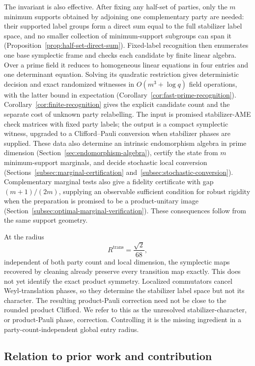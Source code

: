 The invariant is also effective.  After fixing any half-set of parties,
only the \(m\) minimum supports obtained by adjoining one complementary
party are needed: their supported label groups form a direct sum equal to
the full stabilizer label space, and no smaller collection of
minimum-support subgroups can span it
(Proposition~\ref{prop:half-set-direct-sum}).  Fixed-label recognition then
enumerates one base symplectic frame and checks each candidate by finite
linear algebra.  Over a prime field it reduces to homogeneous linear
equations in four entries and one determinant equation.  Solving its
quadratic restriction gives deterministic decision and exact randomized
witnesses in \(O(m^3+\log q)\) field operations, with the latter bound
in expectation (Corollary~\ref{cor:fast-prime-recognition}).  Corollary~\ref{cor:finite-recognition} gives the explicit
candidate count and the separate cost of unknown party relabelling.
The input is promised stabilizer-AME check matrices with fixed party labels;
the output is a compact symplectic witness, upgraded to a Clifford--Pauli
conversion when stabilizer phases are supplied.  These data also determine
an intrinsic endomorphism algebra in prime dimension
(Section~\ref{sec:endomorphism-algebra}), certify the state from \(m\)
minimum-support marginals, and decide stochastic local conversion
(Sections~\ref{subsec:marginal-certification} and~\ref{subsec:stochastic-conversion}).  Complementary marginal tests also give a fidelity certificate with gap
\((m+1)/(2m)\), supplying an observable sufficient condition for robust
rigidity when the preparation is promised to be a product-unitary image
(Section~\ref{subsec:optimal-marginal-verification}).  These consequences
follow from the same support geometry.

At the radius
\[
 R^{\mathrm{trans}}=\frac{\sqrt2}{68},                 \tag{1.4}
\]
independent of both party count and local dimension,
the symplectic maps recovered by cleaning already preserve every transition
map exactly.  This does not yet identify the exact product symmetry.
Localized commutators cancel Weyl-translation phases, so they determine the
stabilizer label space but not its character.  The resulting product-Pauli
correction need not be close to the rounded product Clifford.  We refer to
this as the unresolved stabilizer-character, or product-Pauli phase,
correction.  Controlling it is the missing ingredient in a
party-count-independent global entry radius.

\subsection*{Relation to prior work and contribution}

